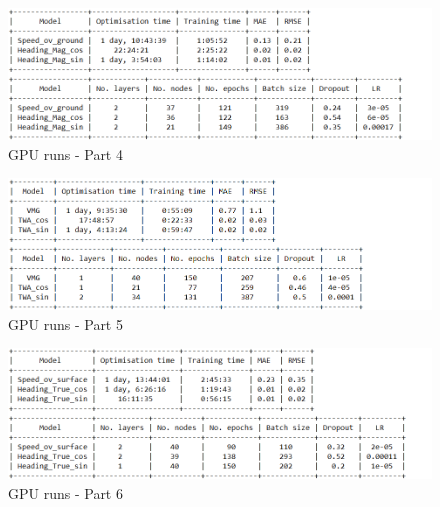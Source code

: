 \begin{figure}[h]
\centering
\includegraphics[width = \hsize]{figures/Contribution/gpu-runs/part4.png}
\caption{GPU runs - Part 4}
\end{figure}

\begin{figure}[h]
\centering
\includegraphics[width = \hsize]{figures/Contribution/gpu-runs/part5.png}
\caption{GPU runs - Part 5}
\end{figure}

\begin{figure}[h]
\centering
\includegraphics[width = \hsize]{figures/Contribution/gpu-runs/part6.png}
\caption{GPU runs - Part 6}
\end{figure}